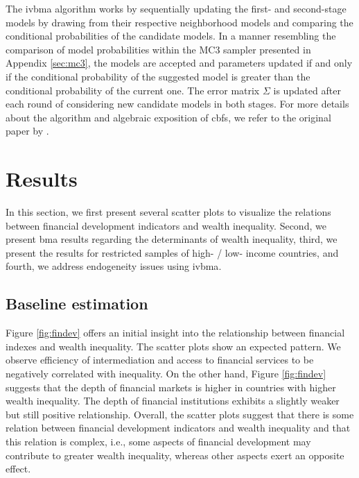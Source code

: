 \documentclass[a4paper,11pt]{article}
\begin{document}
The \ac{ivbma} algorithm works by sequentially updating the first- and second-stage models by drawing from their respective neighborhood models and comparing the conditional probabilities of the candidate models. In a manner resembling the comparison of model probabilities within the MC3 sampler presented in Appendix \ref{sec:mc3}, the models are accepted and parameters updated if and only if the conditional probability of the suggested model is greater than the conditional probability of the current one. The error matrix $\Sigma$ is updated after each round of considering new candidate models in both stages. For more details about the algorithm and algebraic exposition of \acp{cbf}, we refer to the original paper by \cite{KarlLenkoski2012}.

%
%
%
%
%

\section{Results}
\label{sec:results}
In this section, we first present several scatter plots to visualize the relations between financial development indicators and wealth inequality. Second, we present \ac{bma} results regarding the determinants of wealth inequality, third, we present the results for restricted samples of high- / low- income countries, and fourth, we address endogeneity issues using \ac{ivbma}.

\subsection{Baseline estimation}
Figure \ref{fig:findev} offers an initial insight into the relationship between financial indexes and wealth inequality. The scatter plots show an expected pattern.  We observe efficiency of intermediation and access to financial services to be negatively correlated with inequality. On the other hand, Figure \ref{fig:findev} suggests that the depth of financial markets is higher in countries with higher wealth inequality. The depth of financial institutions exhibits a slightly weaker but still positive relationship. Overall, the scatter plots suggest that there is some relation between financial development indicators and wealth inequality and that this relation is complex, i.e., some aspects of financial development may contribute to greater wealth inequality, whereas other aspects exert an opposite effect.
\end{document}
